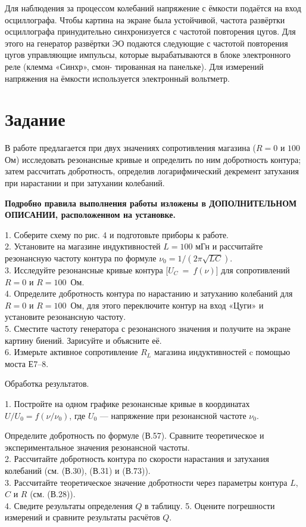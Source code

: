 Для наблюдения за процессом колебаний напряжение с ёмкости подаётся на вход осциллографа. Чтобы картина на экране была устойчивой,
частота развёртки осциллографа принудительно синхронизуется с частотой повторения цугов. Для этого на генератор развёртки ЭО подаются
следующие с частотой повторения цугов управляющие импульсы, которые вырабатываются в блоке электронного реле (клемма «Синхр», смон-
тированная на панельке). Для измерений напряжения на ёмкости используется электронный вольтметр.

\section{\label{sec:level1}Задание}

В работе предлагается при двух значениях сопротивления магазина
($R = 0$ и $100$ Ом) исследовать резонансные кривые и определить по ним
добротность контура; затем рассчитать добротность, определив логарифмический декремент затухания при нарастании и при затухании колебаний.

\begin{center}
\textbf{Подробно правила выполнения работы изложены
в ДОПОЛНИТЕЛЬНОМ ОПИСАНИИ,
расположенном на установке.}
\end{center}
1. Соберите схему по рис. 4 и подготовьте приборы к работе.\\
2. Установите на магазине индуктивностей $L = 100$ мГн и рассчитайте резонансную частоту контура по формуле $\nu_0 = 1/(2\pi \sqrt{LC})$.\\
3. Исследуйте резонансные кривые контура [$U_C~=~f(\nu)$] для сопротивлений
$R = 0$ и $R = 100$~Ом.\\
4. Определите добротность контура по нарастанию и затуханию колебаний
для $R = 0$ и $R = 100$~Ом, для этого переключите контур на вход «Цуги»
и установите резонансную частоту.\\
5. Сместите частоту генератора с резонансного значения и получите на
экране картину биений. Зарисуйте и объясните её.\\
6. Измерьте активное сопротивление $R_L$ магазина индуктивностей c помощью моста Е7–8.
\begin{center}
Обработка результатов.
\end{center}
1. Постройте на одном графике резонансные кривые в координатах $U / U_0 = f(\nu/\nu_0)$, где $U_0$ — напряжение при резонансной частоте $\nu_0$.

Определите добротность по формуле (В.57). Сравните теоретическое
и экспериментальное значения резонансной частоты.\\
2. Рассчитайте добротность контура по скорости нарастания и затухания
колебаний (см. (В.30), (В.31) и (В.73)).\\
3. Рассчитайте теоретическое значение добротности через параметры контура $L$, $C$ и $R$ (см. (В.28)).\\
4. Сведите результаты определения $Q$ в таблицу.
5. Оцените погрешности измерений и сравните результаты расчётов $Q$.
\newpage
